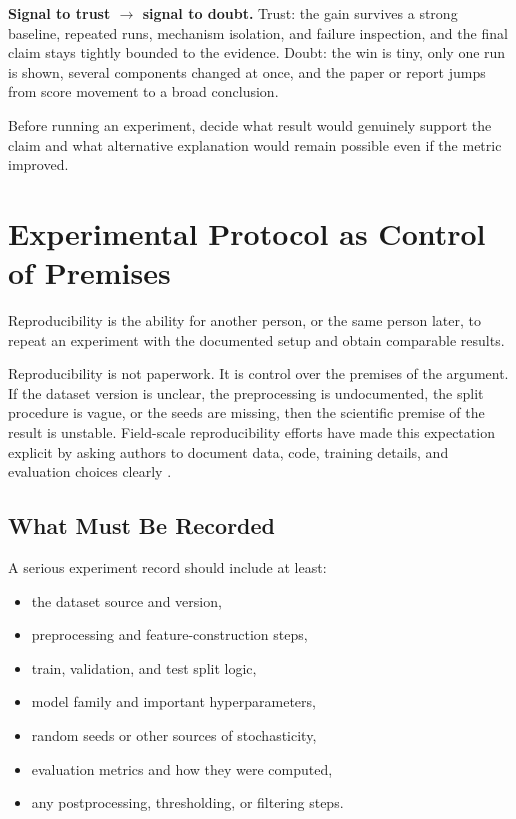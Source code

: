 \begin{thinkingtool}
\textbf{Signal to trust $\rightarrow$ signal to doubt.} Trust: the gain survives a strong baseline, repeated runs, mechanism isolation, and failure inspection, and the final claim stays tightly bounded to the evidence. Doubt: the win is tiny, only one run is shown, several components changed at once, and the paper or report jumps from score movement to a broad conclusion.
\end{thinkingtool}

\begin{decisionbox}
Before running an experiment, decide what result would genuinely support the claim and what alternative explanation would remain possible even if the metric improved.
\end{decisionbox}

\section{Experimental Protocol as Control of Premises}

\begin{definition}[Reproducibility]
Reproducibility is the ability for another person, or the same person later, to repeat an experiment with the documented setup and obtain comparable results.
\end{definition}

Reproducibility is not paperwork. It is control over the premises of the argument. If the dataset version is unclear, the preprocessing is undocumented, the split procedure is vague, or the seeds are missing, then the scientific premise of the result is unstable. Field-scale reproducibility efforts have made this expectation explicit by asking authors to document data, code, training details, and evaluation choices clearly \citep{pineau2021}.

\subsection{What Must Be Recorded}

A serious experiment record should include at least:
\begin{itemize}[leftmargin=*]
\item the dataset source and version,
\item preprocessing and feature-construction steps,
\item train, validation, and test split logic,
\item model family and important hyperparameters,
\item random seeds or other sources of stochasticity,
\item evaluation metrics and how they were computed,
\item any postprocessing, thresholding, or filtering steps.
\end{itemize}

